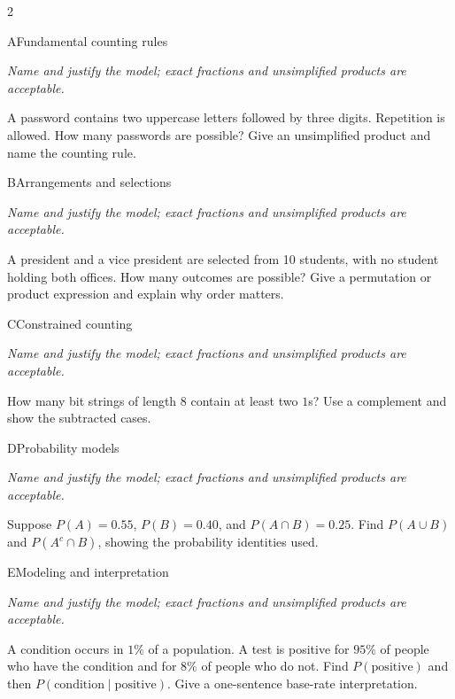 \documentclass[9pt]{extarticle}
\begin{document}
\begin{multicols}{2}
\begin{CoreProblem}{A}{Fundamental counting rules}
{\scriptsize\textit{Name and justify the model; exact fractions and unsimplified products are acceptable.}\par}
A password contains two uppercase letters followed by three digits.
    Repetition is allowed. How many passwords are possible? Give an unsimplified
    product and name the counting rule.
\end{CoreProblem}
\begin{CoreProblem}{B}{Arrangements and selections}
{\scriptsize\textit{Name and justify the model; exact fractions and unsimplified products are acceptable.}\par}
A president and a vice president are selected from 10 students, with
    no student holding both offices. How many outcomes are possible? Give a
    permutation or product expression and explain why order matters.
\end{CoreProblem}
\begin{CoreProblem}{C}{Constrained counting}
{\scriptsize\textit{Name and justify the model; exact fractions and unsimplified products are acceptable.}\par}
How many bit strings of length 8 contain at least two $1$s? Use a
    complement and show the subtracted cases.
\end{CoreProblem}
\columnbreak
\begin{CoreProblem}{D}{Probability models}
{\scriptsize\textit{Name and justify the model; exact fractions and unsimplified products are acceptable.}\par}
Suppose $P(A)=0.55$, $P(B)=0.40$, and $P(A\cap B)=0.25$. Find
    $P(A\cup B)$ and $P(A^c\cap B)$, showing the probability identities used.
\end{CoreProblem}
\begin{CoreProblem}{E}{Modeling and interpretation}
{\scriptsize\textit{Name and justify the model; exact fractions and unsimplified products are acceptable.}\par}
A condition occurs in $1\%$ of a population. A test is positive for
    $95\%$ of people who have the condition and for $8\%$ of people who do not.
    Find $P(\text{positive})$ and then
    $P(\text{condition}\mid\text{positive})$. Give a one-sentence base-rate
    interpretation.
\end{CoreProblem}
\end{multicols}
\CoreWorkArea
\FormBreak
{}
\end{document}
